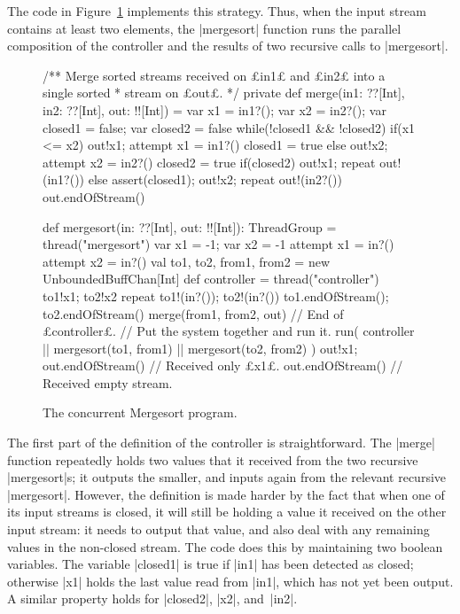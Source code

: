 The code in Figure~\ref{fig:mergesort} implements this strategy.  
Thus, when the input stream contains at least two elements, the
|mergesort| function runs the parallel composition of the controller and the
results of two recursive calls to |mergesort|.

\begin{figure}
\begin{scala}
  /** Merge sorted streams received on £in1£ and £in2£ into a single sorted
    * stream on £out£. */
  private def merge(in1: ??[Int], in2: ??[Int], out: !![Int]) = {
    var x1 = in1?(); var x2 = in2?(); var closed1 = false; var closed2 = false
    while(!closed1 && !closed2){
      if(x1 <= x2){ out!x1; attempt{ x1 = in1?() }{ closed1 = true } }
      else{ out!x2; attempt{ x2 = in2?() }{ closed2 = true } }
    }
    if(closed2){ out!x1; repeat{ out!(in1?()) } }
    else{ assert(closed1); out!x2; repeat{ out!(in2?()) } }
    out.endOfStream()
  }

  def mergesort(in: ??[Int], out: !![Int]): ThreadGroup = thread("mergesort"){
    var x1 = -1; var x2 = -1
    attempt{ 
      x1 = in?()
      attempt{
        x2 = in?()
        val to1, to2, from1, from2 = new UnboundedBuffChan[Int]
        def controller = thread("controller"){
          to1!x1; to2!x2
          repeat{ to1!(in?()); to2!(in?()) }
          to1.endOfStream(); to2.endOfStream()
          merge(from1, from2, out)
        } // End of £controller£.
        // Put the system together and run it.
        run( controller || mergesort(to1, from1) || mergesort(to2, from2) )
      }{ out!x1; out.endOfStream() } // Received only £x1£.
    }{ out.endOfStream() } // Received empty stream.
  }
\end{scala}
\caption{The concurrent Mergesort program.}
\label{fig:mergesort}
\end{figure}

The first part of the definition of the controller is straightforward.  The
|merge| function repeatedly holds two values that it received from the two
recursive |mergesort|s; it outputs the smaller, and inputs again from the
relevant recursive |mergesort|.  However, the definition is made harder by the
fact that when one of its input streams is closed, it will still be holding a
value it received on the other input stream: it needs to output that value,
and also deal with any remaining values in the non-closed stream.  The code
does this by maintaining two boolean variables.  The variable |closed1| is
true if |in1| has been detected as closed; otherwise |x1| holds the last value
read from |in1|, which has not yet been output.  A similar property holds for
|closed2|, |x2|, and~|in2|.

